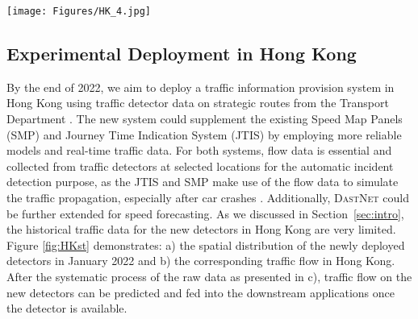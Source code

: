 \documentclass[sigconf]{acmart}
\theoremstyle{definition}
\begin{document}
\begin{figure*}[tb]
    \centering
    \texttt{[image: Figures/HK\_4.jpg]}
\caption{Traffic data and system workflow for the experimental deployment of \textsc{DastNet} in Hong Kong.}
    \label{fig:HKst}
\end{figure*}


\subsection{Experimental Deployment in Hong Kong}


By the end of 2022, we aim to deploy a traffic information provision system in Hong Kong using traffic detector data on strategic routes from the Transport Department \cite{transportdepartment}. 
The new system could supplement the existing Speed Map Panels (SMP) and Journey Time Indication System (JTIS) by employing more reliable models and real-time traffic data. 
For both systems, flow data is essential and collected from traffic detectors at selected locations for the automatic incident detection purpose, as the JTIS and SMP make use of the flow data to simulate the traffic propagation, especially after car crashes \cite{tam2011application}. Additionally, \textsc{DastNet} could be further extended for speed forecasting. 
As we discussed in Section~\ref{sec:intro}, the historical traffic data for the new detectors in Hong Kong are very limited. 
Figure \ref{fig:HKst} demonstrates: a) the spatial distribution of the newly deployed detectors in January 2022 and b) the corresponding traffic flow in Hong Kong. After the systematic process of the raw data as presented in c), traffic flow on the new detectors can be predicted and fed into the downstream applications once the detector is available.
\end{document}
